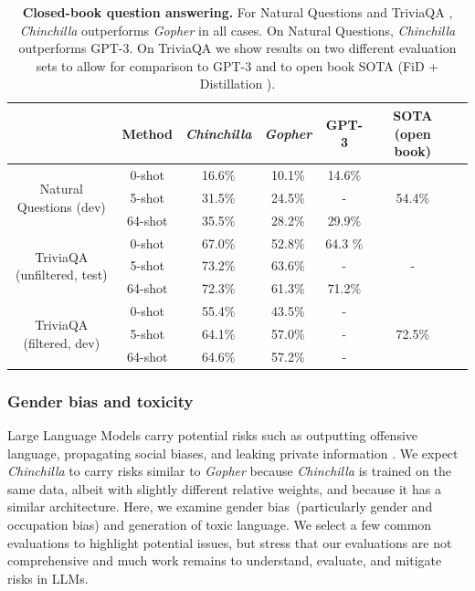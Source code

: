 \documentclass[11pt, a4paper, logo, copyright, nonumbering]{deepmind}
\newcommand{\gopher}{\textit{Gopher}\xspace}
\newcommand{\chinchilla}{\textit{Chinchilla}\xspace}
\begin{document}
\begin{table}[t]
    \centering
    \begin{tabular}{c c c c c c c}
    \toprule
    & Method & \chinchilla & \gopher & GPT-3 & SOTA (open book) \\
    \midrule
    \multirow{3}{*}{Natural Questions (dev)} & 0-shot & 16.6\% &  10.1\% &  14.6\%  & \multirow{3}{*}{54.4\%} \\
    & 5-shot & 31.5\% & 24.5\% & -  & \\
    & 64-shot & 35.5\% & 28.2\% & 29.9\% &  \\
    \midrule
    \multirow{3}{*}{TriviaQA (unfiltered, test)} & 0-shot & 67.0\% & 52.8\% & 64.3 \% & \multirow{3}{*}{-} \\
    & 5-shot & 73.2\% & 63.6\%  &  - &   \\
    & 64-shot & 72.3\% & 61.3\% & 71.2\% & \\
    \midrule
    \multirow{3}{*}{TriviaQA (filtered, dev)} & 0-shot & 55.4\% & 43.5\% & - & \multirow{3}{*}{72.5\%} \\
    & 5-shot &  64.1\% &  57.0\% &  - &   \\
    & 64-shot & 64.6\% & 57.2\% & - & \\
    \bottomrule
    \end{tabular}
    \caption{\textbf{Closed-book question answering.}
    For Natural Questions \citep{naturalquestions} and TriviaQA \citep{triviaqa}, \chinchilla outperforms \gopher in all cases. On Natural Questions, \chinchilla outperforms GPT-3. On TriviaQA we show results on two different evaluation sets to allow for comparison to GPT-3 and to open book SOTA (FiD + Distillation \citep{izacard2020distilling}).
    }
    \label{tab:QA}
\end{table}


\subsubsection{Gender bias and toxicity}
Large Language Models carry potential risks such as outputting offensive language, propagating social biases, and leaking private information \citep{weidinger2021harms,bender2021dangers}.
We expect \chinchilla to carry risks similar to \gopher because \chinchilla is trained on the same data, albeit with slightly different relative weights, and because it has a similar architecture.
Here, we examine gender bias~(particularly gender and occupation bias) and generation of toxic language.
We select a few common evaluations to highlight potential issues, but stress that our evaluations are not comprehensive and much work remains to understand, evaluate, and mitigate risks in LLMs. 
\end{document}
